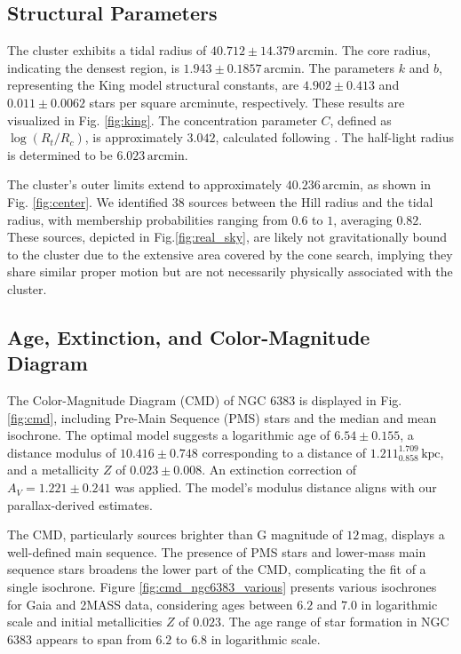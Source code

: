 \documentclass[fleqn,usenatbib,usedcolumn,useAMS]{mnras}
\begin{document}
\subsection{Structural Parameters}

The cluster exhibits a tidal radius of $40.712 \pm 14.379\,\mathrm{arcmin}$. The core radius, indicating the densest region, is $1.943 \pm 0.1857\,\mathrm{arcmin}$. The parameters $ k $ and $ b $, representing the King model structural constants, are $4.902 \pm 0.413$ and $0.011 \pm 0.0062$ stars per square arcminute, respectively. These results are visualized in Fig. \ref{fig:king}. The concentration parameter $ C $, defined as $ \log(R_t/R_c) $, is approximately $3.042$, calculated following \citet{1975AJ.....80..427P}. The half-light radius is determined to be $6.023\,\mathrm{arcmin}$.

The cluster's outer limits extend to approximately $40.236\,\mathrm{arcmin}$, as shown in Fig. \ref{fig:center}. We identified $38$ sources between the Hill radius and the tidal radius, with membership probabilities ranging from $0.6$ to $1$, averaging $0.82$. These sources, depicted in Fig.\ref{fig:real_sky}, are likely not gravitationally bound to the cluster due to the extensive area covered by the cone search, implying they share similar proper motion but are not necessarily physically associated with the cluster.

\subsection{Age, Extinction, and Color-Magnitude Diagram}

The Color-Magnitude Diagram (CMD) of NGC 6383 is displayed in Fig. \ref{fig:cmd}, including Pre-Main Sequence (PMS) stars and the median and mean isochrone. The optimal model suggests a logarithmic age of $6.54 \pm 0.155$, a distance modulus of $10.416 \pm 0.748$ corresponding to a distance of $1.211_{0.858}^{1.709}\,\mathrm{kpc}$, and a metallicity $ Z $ of $0.023 \pm 0.008$. An extinction correction of $A_V= 1.221 \pm 0.241$ was applied. The model's modulus distance aligns with our parallax-derived estimates.

The CMD, particularly sources brighter than G magnitude of $12\,\mathrm{mag}$, displays a well-defined main sequence. The presence of PMS stars and lower-mass main sequence stars broadens the lower part of the CMD, complicating the fit of a single isochrone. Figure \ref{fig:cmd_ngc6383_various} presents various isochrones for Gaia and 2MASS data, considering ages between $6.2$ and $7.0$ in logarithmic scale and initial metallicities $ Z $ of $0.023$. The age range of star formation in NGC 6383 appears to span from $6.2$ to $6.8$ in logarithmic scale.
\end{document}
